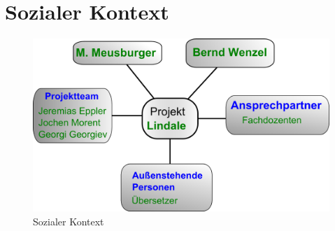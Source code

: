 \section{Sozialer Kontext}
\begin{figure}[!ht]
\includegraphics[width=\linewidth]{images/sozialer-kontetxt}
\caption{Sozialer Kontext}
\end{figure}